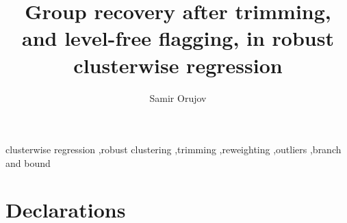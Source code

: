 \documentclass[preprint,12pt,authoryear]{elsarticle}
\begin{document}
\begin{frontmatter}
\title{Group recovery after trimming, and level-free flagging, in robust clusterwise
regression}
\author{Samir Orujov}



\begin{keyword}
clusterwise regression \sep robust clustering \sep trimming \sep reweighting \sep outliers
\sep branch and bound
\end{keyword}
\end{frontmatter}








\section*{Declarations}



\end{document}
